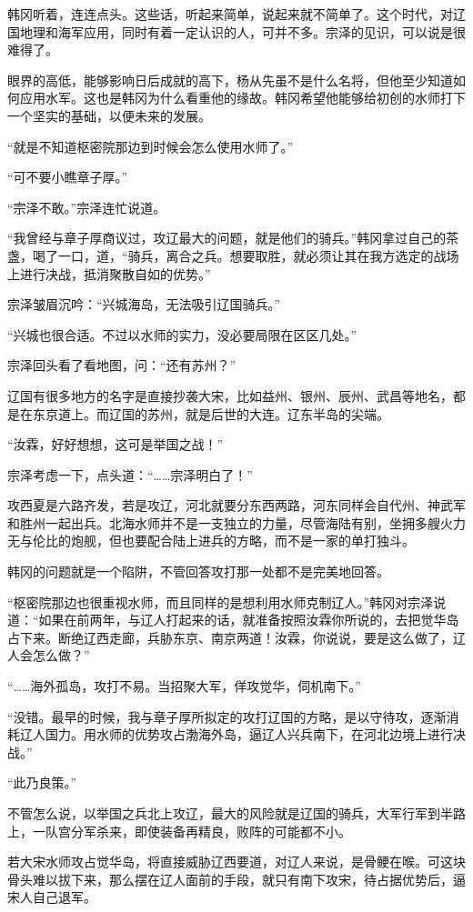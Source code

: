 韩冈听着，连连点头。这些话，听起来简单，说起来就不简单了。这个时代，对辽国地理和海军应用，同时有着一定认识的人，可并不多。宗泽的见识，可以说是很难得了。

眼界的高低，能够影响日后成就的高下，杨从先虽不是什么名将，但他至少知道如何应用水军。这也是韩冈为什么看重他的缘故。韩冈希望他能够给初创的水师打下一个坚实的基础，以便未来的发展。

“就是不知道枢密院那边到时候会怎么使用水师了。”

“可不要小瞧章子厚。”

“宗泽不敢。”宗泽连忙说道。

“我曾经与章子厚商议过，攻辽最大的问题，就是他们的骑兵。”韩冈拿过自己的茶盏，喝了一口，道，“骑兵，离合之兵。想要取胜，就必须让其在我方选定的战场上进行决战，抵消聚散自如的优势。”

宗泽皱眉沉吟：“兴城海岛，无法吸引辽国骑兵。”

“兴城也很合适。不过以水师的实力，没必要局限在区区几处。”

宗泽回头看了看地图，问：“还有苏州？”

辽国有很多地方的名字是直接抄袭大宋，比如益州、银州、辰州、武昌等地名，都是在东京道上。而辽国的苏州，就是后世的大连。辽东半岛的尖端。

“汝霖，好好想想，这可是举国之战！”

宗泽考虑一下，点头道：“……宗泽明白了！”

攻西夏是六路齐发，若是攻辽，河北就要分东西两路，河东同样会自代州、神武军和胜州一起出兵。北海水师并不是一支独立的力量，尽管海陆有别，坐拥多艘火力无与伦比的炮舰，但也要配合陆上进兵的方略，而不是一家的单打独斗。

韩冈的问题就是一个陷阱，不管回答攻打那一处都不是完美地回答。

“枢密院那边也很重视水师，而且同样的是想利用水师克制辽人。”韩冈对宗泽说道：“如果在前两年，与辽人打起来的话，就准备按照汝霖你所说的，去把觉华岛占下来。断绝辽西走廊，兵胁东京、南京两道！汝霖，你说说，要是这么做了，辽人会怎么做？”

“……海外孤岛，攻打不易。当招聚大军，佯攻觉华，伺机南下。”

“没错。最早的时候，我与章子厚所拟定的攻打辽国的方略，是以守待攻，逐渐消耗辽人国力。用水师的优势攻占渤海外岛，逼辽人兴兵南下，在河北边境上进行决战。”

“此乃良策。”

不管怎么说，以举国之兵北上攻辽，最大的风险就是辽国的骑兵，大军行军到半路上，一队宫分军杀来，即使装备再精良，败阵的可能都不小。

若大宋水师攻占觉华岛，将直接威胁辽西要道，对辽人来说，是骨鲠在喉。可这块骨头难以拔下来，那么摆在辽人面前的手段，就只有南下攻宋，待占据优势后，逼宋人自己退军。

